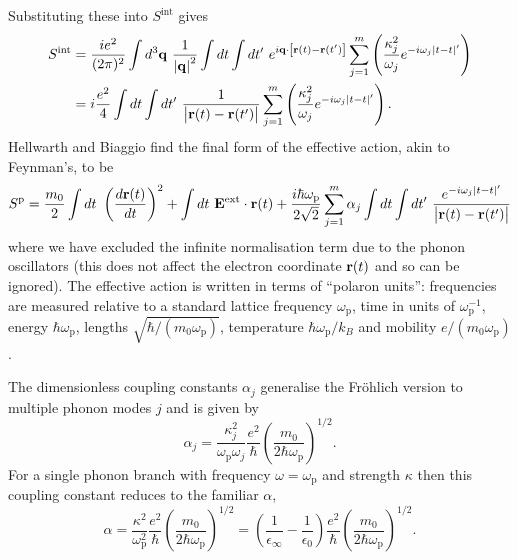 Substituting these into $S^{\text{int}}$ gives
\begin{equation}
    \begin{aligned}
        S^{\text{int}} &= \frac{i e^2}{(2\pi)^2} \int d^3 \vb{q}\ \frac{1}{\abs{\vb{q}}^2} \int dt \int dt'\ e^{i\vb{q} \cdot \left[ \vb{r}(t) - \vb{r}(t') \right]} \sum_{j = 1}^m \left( \frac{\kappa_j^2}{\omega_j} e^{-i\omega_j\abs{t-t}'} \right) \\
        &= i \frac{e^2}{4} \int dt \int dt'\ \frac{1}{\abs{\vb{r}(t) - \vb{r}(t')}} \sum_{j=1}^m \left( \frac{\kappa_j^2}{\omega_j} e^{-i\omega_j\abs{t-t}'} \right).
    \end{aligned}
\end{equation}
Hellwarth and Biaggio find the final form of the effective action, akin to Feynman's, to be
\begin{equation}\label{eqn:HI_eff_action}
    S^{\text{p}} = \frac{m_0}{2} \int dt\ \left( \frac{d\vb{r}(t)}{dt} \right)^2 + \int dt\ \vb{E}^{\text{ext}} \cdot \vb{r}(t) \\
    + \frac{i\hbar\omega_{\text{p}}}{2\sqrt{2}} \sum_{j = 1}^m \alpha_j \int dt \int dt'\ \frac{e^{-i\omega_j \abs{t-t}'}}{\abs{\vb{r}(t) - \vb{r}(t')}} 
\end{equation}
where we have excluded the infinite normalisation term due to the phonon oscillators (this does not affect the electron coordinate $\vb{r}(t)$ and so can be ignored). The effective action is written in terms of ``polaron units'': frequencies are measured relative to a standard lattice frequency $\omega_{\text{p}}$, time in units of $\omega_{\text{p}}^{-1}$, energy $\hbar \omega_{\text{p}}$, lengths $\sqrt{\hbar/(m_0 \omega_{\text{p}})}$, temperature $\hbar\omega_{\text{p}}/k_B$ and mobility $e/(m_0 \omega_{\text{p}})$. 

The dimensionless coupling constants $\alpha_j$ generalise the Fr\"ohlich version to multiple phonon modes $j$ and is given by
\begin{equation}
    \alpha_j = \frac{\kappa_j^2}{\omega_{\text{p}} \omega_j} \frac{e^2}{\hbar} \left( \frac{m_0}{2 \hbar \omega_{\text{p}}} \right)^{1/2}.
\end{equation}
For a single phonon branch with frequency $\omega = \omega_{\text{p}}$ and strength $\kappa$ then this coupling constant reduces to the familiar $\alpha$,
\begin{equation}
    \alpha = \frac{\kappa^2}{\omega^2_{\text{p}}} \frac{e^2}{\hbar} \left( \frac{m_0}{2\hbar\omega_{\text{p}}} \right)^{1/2} = \left( \frac{1}{\epsilon_\infty} - \frac{1}{\epsilon_0} \right) \frac{e^2}{\hbar} \left( \frac{m_0}{2\hbar\omega_{\text{p}}} \right)^{1/2}.
\end{equation}

